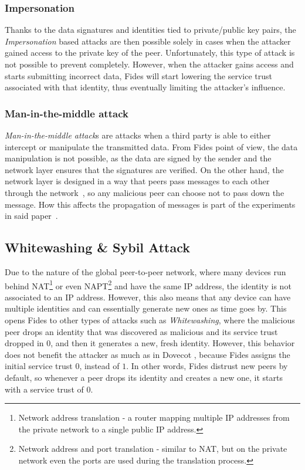 \subsubsection{Impersonation}
Thanks to the data signatures and identities tied to private/public key pairs, the \textit{Impersonation} based attacks are then possible solely in cases when the attacker gained access to the private key of the peer.
Unfortunately, this type of attack is not possible to prevent completely. 
However, when the attacker gains access and starts submitting incorrect data, Fides will start lowering the service trust associated with that identity, thus eventually limiting the attacker's influence.

\subsubsection{Man-in-the-middle attack}
\textit{Man-in-the-middle attack}s are attacks when a third party is able to either intercept or manipulate the transmitted data.
From Fides point of view, the data manipulation is not possible, as the data are signed by the sender and the network layer \cite{nl} ensures that the signatures are verified.
On the other hand, the network layer is designed in a way that peers pass messages to each other through the network~\cite{nl}, so any malicious peer can choose not to pass down the message.
How this affects the propagation of messages is part of the experiments in said paper~\cite{nl}.

\subsection{Whitewashing \& Sybil Attack}
\label{subsec:whitewashing-and-sybil-attack}
Due to the nature of the global peer-to-peer network, where many devices run behind NAT\footnote{Network address translation - a router mapping multiple IP addresses from the private network to a single public IP address.} or even NAPT\footnote{Network address and port translation - similar to NAT, but on the private network even the ports are used during the translation process.} and have the same IP address, the identity is not associated to an IP address.
However, this also means that any device can have multiple identities and can essentially generate new ones as time goes by.
This opens Fides to other types of attacks such as \textit{Whitewashing}, where the malicious peer drops an identity that was discovered as malicious and its service trust dropped in $0$, and then it generates a new, fresh identity.
However, this behavior does not benefit the attacker as much as in Dovecot \cite{dita}, because Fides assigns the initial service trust $0$, instead of $1$.
In other words, Fides distrust new peers by default, so whenever a peer drops its identity and creates a new one, it starts with a service trust of $0$.

